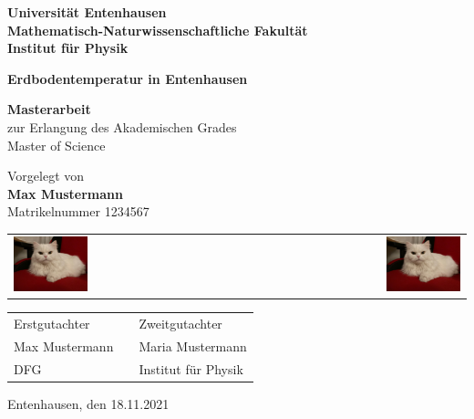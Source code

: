 \documentclass[ngerman,12pt]{scrreprt}
\begin{document}
\begin{titlepage}
\begin{center}
\textbf{\large Universität Entenhausen \\ Mathematisch-Naturwissenschaftliche Fakultät \\ Institut für Physik}
\end{center}\vspace*{2cm}

\begin{center}
{\bfseries\huge Erdbodentemperatur in Entenhausen}
\end{center}\vspace*{1cm}

\begin{center}
{\Large {\bfseries Masterarbeit} \\ zur Erlangung des Akademischen Grades \\ Master of Science}
\end{center}\vspace*{1cm}

\begin{center}
{\Large Vorgelegt von \\ \textbf{Max Mustermann} \\ Matrikelnummer 1234567 }
\end{center}\vspace*{1cm}

\begin{tabular}{lp{2.5cm}r}
\includegraphics[width=0.35\textwidth]{Bilder/Katze2} & & \includegraphics[width=0.35\textwidth]{Bilder/Katze2}
\end{tabular}\vspace*{1cm}

\begin{tabular}{lp{5cm}l}
Erstgutachter & & Zweitgutachter \\
Max Mustermann & & Maria Mustermann \\
DFG & & Institut für Physik  
\end{tabular}

\vspace*{2cm}
\begin{center}
Entenhausen, den 18.11.2021
\end{center}

\end{titlepage}
\end{document}
